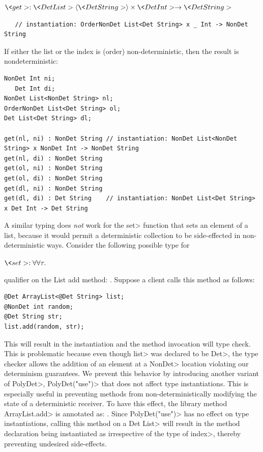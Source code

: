 $\<get> : \<Det List>\angles{\<Det String>} \times \<Det Int> \rightarrow \<Det String>$

\begin{Verbatim}
   // instantiation: OrderNonDet List<Det String> x _ Int -> NonDet String 
\end{Verbatim}

If either the list or the index is (order) non-deterministic, then the result is
nondeterministic:

\begin{Verbatim}
NonDet Int ni;
   Det Int di;
NonDet List<NonDet String> nl;
OrderNonDet List<Det String> ol;
Det List<Det String> dl;

get(nl, ni) : NonDet String // instantiation: NonDet List<NonDet String> x NonDet Int -> NonDet String
get(nl, di) : NonDet String
get(ol, ni) : NonDet String
get(ol, di) : NonDet String
get(dl, ni) : NonDet String
get(dl, di) : Det String    // instantiation: NonDet List<Det String> x Det Int -> Det String
\end{Verbatim}


A similar typing does \emph{not} work for the \<set> function that sets an
element of a list, because it would permit a deterministic collection to
be side-effected in non-deterministic ways.  Consider the following
possible type for

$\<set> : \forall \forallt{\tau}$

qualifier 
on the List add method: .
Suppose a client calls this method as follows:
\begin{verbatim}
@Det ArrayList<@Det String> list;
@NonDet int random;
@Det String str;
list.add(random, str);
\end{verbatim}
This will result in the instantiation  and
the method invocation will type check. This is problematic because even though \<list> was declared to be \<Det>,
the type checker allows the addition of an element at a \<NonDet> location violating our determinism guarantees.
We prevent this behavior by introducing another variant of \<PolyDet>, \<PolyDet("use")> that does not affect
type instantiations. This is especially useful in preventing methods from non-deterministically modifying the state
of a deterministic receiver. To have this effect, the library method \<ArrayList.add> is annotated as:
.
Since \<PolyDet("use")> has no effect on type instantiations, calling this method on a \<Det List>
will result in the method declaration being instantiated as 
irrespective of the type of \<index>, thereby preventing undesired side-effects.


